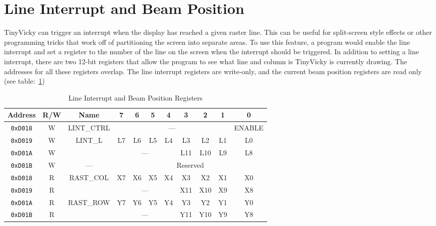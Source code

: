 \section{Line Interrupt and Beam Position}

TinyVicky can trigger an interrupt when the display has reached a given raster line. This can be useful for split-screen style effects or other programming tricks that work off of partitioning the screen into separate areas. To use this feature, a program would enable the line interrupt and set a register to the number of the line on the screen when the interrupt should be triggered. In addition to setting a line interrupt, there are two 12-bit registers that allow the program to see what line and column is TinyVicky is currently drawing. The addresses for all these registers overlap. The line interrupt registers are write-only, and the current beam position registers are read only (see table:~\ref{tab:lint_reg})

\begin{table}[h]
    \begin{center}
        \begin{tabular}{|c|c|c|c|c|c|c|c|c|c|c|} \hline
            Address & R/W & Name & 7 & 6 & 5 & 4 & 3 & 2 & 1 & 0 \\\hline\hline
            \verb+0xD018+ & W & LINT\_CTRL & \multicolumn{7}{|c|}{---} & ENABLE \\ \hline
            \verb+0xD019+ & W & \multirow{2}{*}{LINT\_L} & L7 & L6 & L5 & L4 & L3 & L2 & L1 & L0 \\ \cline{1-2}\cline{4-11}
            \verb+0xD01A+ & W &  & \multicolumn{4}{|c|}{---} & L11 & L10 & L9 & L8 \\ \hline
            \verb+0xD01B+ & W & --- & \multicolumn{8}{|c|}{Reserved} \\ \hline

            \verb+0xD018+ & R & \multirow{2}{*}{RAST\_COL} & X7 & X6 & X5 & X4 & X3 & X2 & X1 & X0 \\  \cline{1-2}\cline{4-11}
            \verb+0xD019+ & R & & \multicolumn{4}{|c|}{---} & X11 & X10 & X9 & X8 \\ \hline
            \verb+0xD01A+ & R & \multirow{2}{*}{RAST\_ROW} & Y7 & Y6 & Y5 & Y4 & Y3 & Y2 & Y1 & Y0 \\  \cline{1-2}\cline{4-11}
            \verb+0xD01B+ & R & & \multicolumn{4}{|c|}{---} & Y11 & Y10 & Y9 & Y8 \\ \hline
        \end{tabular}
    \end{center}
    \caption{Line Interrupt and Beam Position Registers}
    \label{tab:lint_reg}
\end{table}

